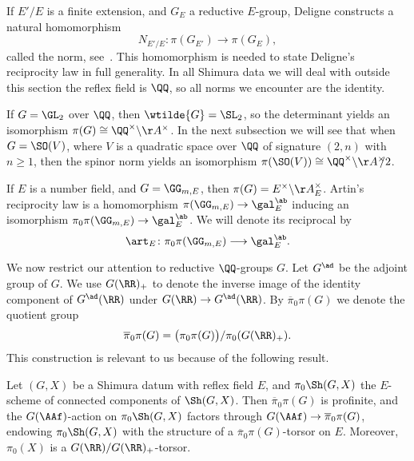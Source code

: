 \begin{remark}
If $E'/E$ is a finite extension, and $G_E$ a reductive $E$-group, Deligne constructs a natural homomorphism
$$
N_{E'/E}\colon \pi(G_{E'}) \longrightarrow \pi(G_E),
$$
called the norm, see~\cite[(2.4.0.1)]{Deligne79}. This homomorphism is needed to state Deligne's reciprocity law in full generality. In all Shimura data we will deal with outside this section the reflex field is $\QQ$, so all norms we encounter are the identity.
\end{remark}

\begin{example}
    If $G = \GL_2$ over $\QQ$, then $\wtilde{G} = \SL_2$, so the determinant yields an isomorphism $\pi(G) \cong \QQ^{\times} \backslash \AA^{\times}$. In the next subsection we will see that when $G = \SO(V)$, where $V$ is a quadratic space over $\QQ$ of signature $(2,n)$ with $n \geq 1$, then the spinor norm yields an isomorphism $\pi(\SO(V)) \cong \QQ^{\times} \backslash \AA^{\times}\hspace{-5pt}/2$.
\end{example}

\begin{example}\label{exa:reciprocity_law_pi_gm}
If $E$ is a number field, and $G = \GG_{m,E}$, then $\pi(G) = E^{\times} \backslash \AA_{E}^{\times}$. Artin's reciprocity law is a homomorphism $\pi(\GG_{m,E}) \rightarrow \gal^{\ab}_{E}$ inducing an isomorphism $\pi_0 \pi(\GG_{m,E}) \rightarrow \gal_{E}^{\ab}$. We will denote its reciprocal by
    $$
    \art_E\colon \pi_0 \pi(\GG_{m,E}) \longrightarrow \gal_E^{\ab}.
    $$
\end{example}

We now restrict our attention to reductive $\QQ$-groups $G$. Let $G^{\ad}$ be the adjoint group of $G$. We use $G(\RR)_+$ to denote the inverse image of the identity component of $G^{\ad}(\RR)$ under $G(\RR) \rightarrow G^{\ad}(\RR)$. By $\overline{\pi}_0 \pi(G)$ we denote the quotient group
$$
\overline{\pi}_0 \pi (G) = \big(\pi_0 \pi(G)\big)/\pi_0(G(\RR)_+).
$$
This construction is relevant to us because of the following result.
\begin{lemma}\label{lem:connected_components_shimura}
    Let $(G,X)$ be a Shimura datum with reflex field $E$, and $\pi_0 \Sh(G,X)$ the $E$-scheme of connected components of $\Sh(G,X)$. Then $\overline{\pi}_0 \pi(G)$ is profinite, and the $G(\AAf)$-action on $\pi_0 \Sh(G,X)$ factors through $G(\AAf) \rightarrow \overline{\pi}_0 \pi(G)$, endowing $\pi_0 \Sh(G,X)$ with the structure of a $\overline{\pi}_0 \pi(G)$-torsor on $E$. Moreover, $\pi_0(X)$ is a $G(\RR)/G(\RR)_+$-torsor.
\end{lemma}

